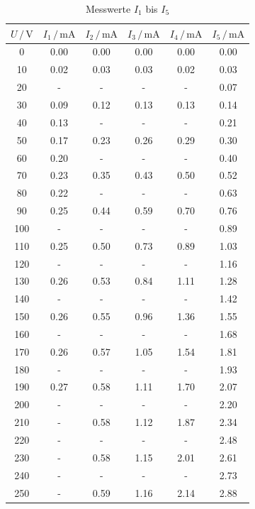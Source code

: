   \begin{table}
  \footnotesize
  \centering
  \caption{Messwerte $I_1$ bis $I_5$}
  \label{tab:mess1}
  \begin{tabular}{c c c c c c}
  \toprule
  $ U \,/\, \si{\volt} $ & $I_1 \,/\, \si{\milli\ampere}$ & $I_2 \,/\, \si{\milli\ampere}$
  & $I_3 \,/\, \si{\milli\ampere}$ & $I_4 \,/\, \si{\milli\ampere}$ 
  & $I_5 \,/\, \si{\milli\ampere}$ \\
  \midrule 
  0    &  0.00  &  0.00 & 0.00  & 0.00 & 0.00  \\              
  10   &  0.02  &  0.03 & 0.03  & 0.02 & 0.03  \\               
  20   &   -    &   -   &  -    &  -   & 0.07  \\   
  30   &  0.09  &  0.12 & 0.13  & 0.13 & 0.14  \\                  
  40   &  0.13  &   -   &  -    &  -   & 0.21  \\     
  50   &  0.17  &  0.23 & 0.26  & 0.29 & 0.30  \\              
  60   &  0.20  &   -   &  -    &  -   & 0.40  \\     
  70   &  0.23  &  0.35 & 0.43  & 0.50 & 0.52  \\               
  80   &  0.22  &   -   &  -    &  -   & 0.63  \\    
  90   &  0.25  &  0.44 & 0.59  & 0.70 & 0.76  \\              
  100  &   -    &   -   &  -    &  -   & 0.89  \\  
  110  &  0.25  &  0.50 & 0.73  & 0.89 & 1.03  \\               
  120  &   -    &   -   &  -    &  -   & 1.16  \\  
  130  &  0.26  &  0.53 & 0.84  & 1.11 & 1.28  \\             
  140  &   -    &   -   &  -    &  -   & 1.42  \\  
  150  &  0.26  &  0.55 & 0.96  & 1.36 & 1.55  \\               
  160  &   -    &   -   &  -    &  -   & 1.68  \\  
  170  &  0.26  &  0.57 & 1.05  & 1.54 & 1.81  \\               
  180  &   -    &   -   &  -    &  -   & 1.93  \\  
  190  &  0.27  &  0.58 & 1.11  & 1.70 & 2.07  \\               
  200  &   -    &   -   &  -    &  -   & 2.20  \\  
  210  &   -    &  0.58 & 1.12  & 1.87 & 2.34  \\           
  220  &   -    &   -   &  -    &  -   & 2.48  \\  
  230  &   -    &  0.58 & 1.15  & 2.01 & 2.61  \\            
  240  &   -    &   -   &  -    &  -   & 2.73  \\ 
  250  &   -    &  0.59 & 1.16  & 2.14 & 2.88  \\            
  \bottomrule    
  \end{tabular}    
  \end{table}

